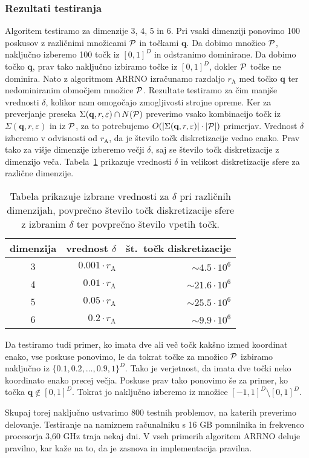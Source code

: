 \subsubsection{Rezultati testiranja}
Algoritem testiramo za dimenzije 3, 4, 5 in 6. Pri vsaki dimenziji ponovimo 100 poskusov z različnimi množicami $\P$ in točkami $\textbf{q}$. Da dobimo množico $\P$, naključno izberemo 100 točk iz $[0, 1]^D$ in odstranimo dominirane. Da dobimo točko $\textbf{q}$, prav tako naključno izbiramo točke iz $[0, 1]^D$, dokler $\P$ točke ne dominira. Nato z algoritmom ARRNO izračunamo razdaljo $r_\text{A}$ med točko $\textbf{q}$ ter nedominiranim območjem množice $\P$. Rezultate testiramo za čim manjše vrednosti $\delta$, kolikor nam omogočajo zmogljivosti strojne opreme. Ker za preverjanje preseka $\Sigma(\textbf{q}, r, \varepsilon) \cap N(\P)$ preverimo vsako kombinacijo točk iz $\Sigma(\textbf{q}, r, \varepsilon)$ in iz $\P$, za to potrebujemo $O(|\Sigma(\textbf{q}, r, \varepsilon)| \cdot |\P|)$ primerjav. Vrednost $\delta$ izberemo v odvisnosti od $r_\text{A}$, da je število točk diskretizacije vedno enako. Prav tako za višje dimenzije izberemo večji $\delta$, saj se število točk diskretizacije z dimenzijo veča. Tabela~\ref{tab:vrednosti_delta} prikazuje vrednosti $\delta$ in velikost diskretizacije sfere za različne dimenzije.
\begin{table}[htb]
    \centering
    \begin{tabular}{c r r}
        dimenzija & vrednost $\delta$ & št.~točk diskretizacije  \\
        \hline
        3 & $0.001 \cdot r_\text{A}$ & $\sim 4.5 \cdot 10^6$ \\
        4 & $0.01 \cdot r_\text{A}$ & $\sim 21.6 \cdot 10^6$ \\
        5 & $0.05 \cdot r_\text{A}$ & $\sim 25.5 \cdot 10^6$ \\
        6 & $0.2 \cdot r_\text{A}$ & $\sim 9.9 \cdot 10^6$ \\
    \end{tabular}
    \caption{Tabela prikazuje izbrane vrednosti za $\delta$ pri različnih dimenzijah, povprečno število točk diskretizacije sfere z izbranim $\delta$ ter povprečno število vpetih točk.}
    \label{tab:vrednosti_delta}
\end{table}

Da testiramo tudi primer, ko imata dve ali več točk kakšno izmed koordinat enako, vse poskuse ponovimo, le da tokrat točke za množico $\P$ izbiramo naključno iz $\{0.1, 0.2, \dots, 0.9, 1 \}^D$. Tako je verjetnost, da imata dve točki neko koordinato enako precej večja. Poskuse prav tako ponovimo še za primer, ko točka $\textbf{q} \notin [0, 1]^D$. Tokrat jo naključno izberemo iz množice $[-1, 1]^D \setminus [0, 1]^D$. 

Skupaj torej naključno ustvarimo $800$ testnih problemov, na katerih preverimo delovanje. Testiranje na namiznem računalniku s 16 GB pomnilnika
in frekvenco procesorja 3,60 GHz traja nekaj dni. V vseh primerih algoritem ARRNO deluje pravilno, kar kaže na to, da je zasnova in implementacija pravilna.  

